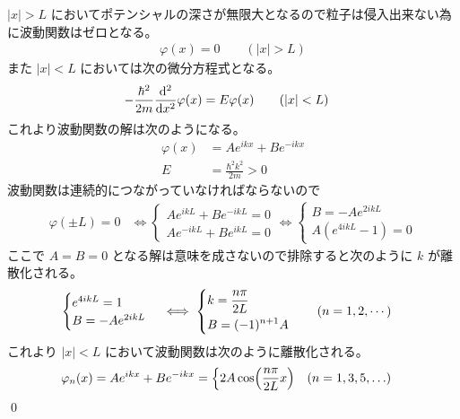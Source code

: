 \documentclass[uplatex,dvipdfmx,a4paper,11pt]{jlreq}
\makeatletter
\numberwithin{equation}{section}
\theoremstyle{definition}
\renewenvironment{proof}[1][\proofname]{\par
  \normalfont
  \topsep6\p@\@plus6\p@ \trivlist
  \item[\hskip\labelsep{\bfseries #1}\@addpunct{\bfseries}]\ignorespaces\quad\par
}{%
  \qed\endtrivlist\@endpefalse
}
\renewcommand\proofname{証明}
\makeatother
\begin{document}
\begin{proof}
  $|x| > L$ においてポテンシャルの深さが無限大となるので粒子は侵入出来ない為に波動関数はゼロとなる。
  \begin{align}
    \varphi(x) = 0 \qquad (|x| > L)
  \end{align}
  また $|x| < L$ においては次の微分方程式となる。
  \begin{align}
    -\frac{\hbar^2}{2m}\dv[2]{x}\varphi(x) & = E\varphi(x) \qquad (|x| < L)
  \end{align}
  これより波動関数の解は次のようになる。
  \begin{align}
    \varphi(x) & = Ae^{ikx} + Be^{-ikx}      \\
    E          & = \frac{\hbar^2k^2}{2m} > 0
  \end{align}
  波動関数は連続的につながっていなければならないので
  \begin{align}
    \varphi(\pm L) = 0 & \iff \begin{cases}
                                Ae^{ikL} + Be^{-ikL} = 0 \\
                                Ae^{-ikL} + Be^{ikL} = 0
                              \end{cases}
    \iff
    \begin{cases}
      B = -Ae^{2ikL} \\
      A(e^{4ikL} - 1) = 0
    \end{cases}
  \end{align}
  ここで $A = B = 0$ となる解は意味を成さないので排除すると次のように $k$ が離散化される。
  \begin{align}
    \begin{cases}
      e^{4ikL} = 1   \\
      B = -Ae^{2ikL} \\
    \end{cases}
     & \iff
    \begin{dcases}
      k = \frac{n\pi}{2L} \\
      B = (-1)^{n+1}A     \\
    \end{dcases} \qquad (n = 1,2,\cdots)
  \end{align}
  これより $|x| < L$ において波動関数は次のように離散化される。
  \begin{align}
    \varphi_n(x) = Ae^{ikx} + Be^{-ikx} & = \begin{dcases}
                                              2A\cos(\frac{n\pi}{2L}x)  & (n = 1,3,5,\ldots) \\

\end{dcases}
\end{align}
\end{proof}
\end{document}
